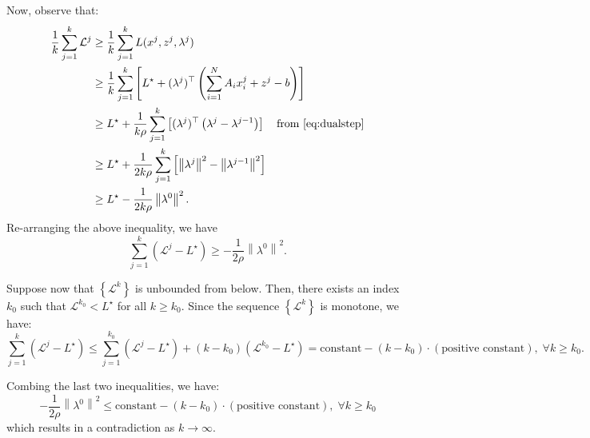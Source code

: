 \documentclass[11pt]{article}
\newcommand{\norm}[1]{\left\lVert #1 \right\rVert}
\begin{document}
Now, observe that:
\begin{align*}
\frac{1}{k}\sum_{j=1}^{k} \mathcal{L}^j & \geq \frac{1}{k}\sum_{j=1}^k L(x^j, z^j, \lambda^j) \\
&\geq \frac{1}{k}\sum_{j=1}^k \left[L^\star + (\lambda^j)^\top \left(\sum_{i=1}^N A_i x_i^j + z^j - b\right) \right] \\
&\geq L^\star + \frac{1}{k\rho}\sum_{j=1}^k \left[(\lambda^j)^\top \left(\lambda^j - \lambda^{j-1}\right)\right] \quad \text{from~\eqref{eq:dualstep}}\\
&\geq L^\star + \frac{1}{2k\rho}\sum_{j=1}^k \left[\norm{\lambda^j}^2  - \norm{\lambda^{j-1}}^2\right] \\
&\geq L^\star - \frac{1}{2k\rho}\norm{\lambda^{0}}^2.
\end{align*}
Re-arranging the above inequality, we have
\begin{equation*}
\sum_{j=1}^k (\mathcal{L}^j - L^\star) \geq -\frac{1}{2\rho}\norm{\lambda^{0}}^2.
\end{equation*}

Suppose now that $\left\{\mathcal{L}^k\right\}$ is unbounded from below. Then, there exists an index $k_0$ such that $\mathcal{L}^{k_0} < L^\star$ for all $k \geq k_0$.
Since the sequence $\left\{\mathcal{L}^k\right\}$ is monotone, we have:
\begin{equation*}
\sum_{j=1}^k (\mathcal{L}^j - L^\star) \leq \sum_{j=1}^{k_0} (\mathcal{L}^j - L^\star) + (k - k_0) (\mathcal{L}^{k_0} - L^\star) = \text{constant} - (k - k_0) \cdot (\text{positive constant}), \; \forall k \geq k_0.
\end{equation*}

Combing the last two inequalities, we have:
\begin{equation*}
-\frac{1}{2\rho}\norm{\lambda^{0}}^2 \leq \text{constant} - (k - k_0) \cdot (\text{positive constant}), \; \forall k \geq k_0
\end{equation*}
which results in a contradiction as $k \to \infty$.



\end{document}

